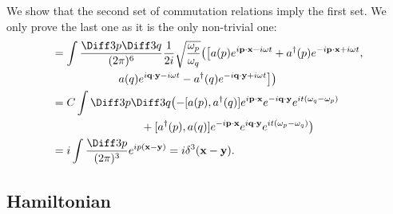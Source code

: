 \documentclass[12pt]{article}
\begin{document}
\begin{proofbox}
	We show that the second set of commutation relations imply the first set. We only prove the last one as it is the only non-trivial one:
	\begin{align*}
		[\phi(\mathbf{x}, t), \Pi(\mathbf{y}, t)] &= \int \frac{\Diff3 p \Diff 3 q}{(2 \pi)^6} \frac{1}{2i} \sqrt{\frac{\omega_p}{\omega_q}} \bigl( \bigl[ a(p) e^{i \mathbf{p} \cdot \mathbf{x} - i \omega t} + a^\dagger (p) e^{-i \mathbf{p} \cdot \mathbf{x} + i \omega t}, \\
							  &\qquad \qquad \qquad a(q) e^{i \mathbf{q} \cdot \mathbf{y} - i \omega t} - a^\dagger(q) e^{-i \mathbf{q} \cdot \mathbf{y} + i \omega t} \bigr] \bigr) \\
							  &= C \int \Diff3 p \Diff3 q \bigl( - [a(p), a^\dagger(q)] e^{i \mathbf{p} \cdot \mathbf{x}} e^{-i \mathbf{q} \cdot \mathbf{y}} e^{it(\omega_q - \omega_p)} \\
							  & \qquad \qquad \qquad \qquad + [a^\dagger(p), a(q)] e^{-i \mathbf{p} \cdot \mathbf{x}} e^{i \mathbf{q} \cdot \mathbf{y}} e^{it(\omega_p - \omega_q)} \bigr) \\
							  &= i \int \frac{\Diff 3 p}{(2 \pi)^3} e^{i p (\mathbf{x} - \mathbf{y})} = i \delta^3(\mathbf{x} - \mathbf{y}).
	\end{align*}
\end{proofbox}


\subsection{Hamiltonian}%
\label{sub:hqft}
\end{document}
